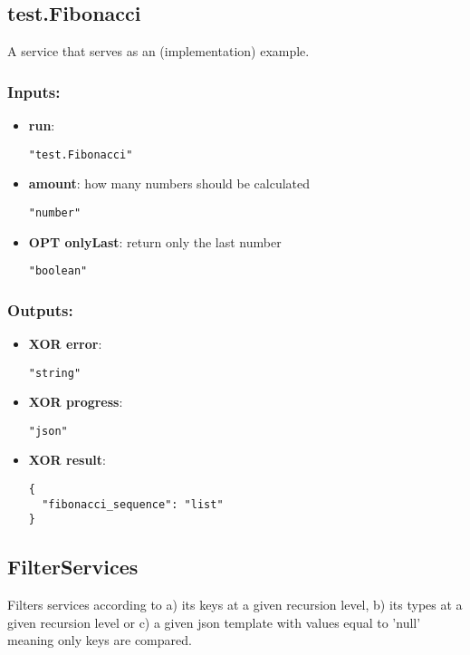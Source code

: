 \subsection{test.Fibonacci}
A service that serves as an (implementation) example.
\subsubsection*{Inputs:}
\begin{itemize}
    \item \textbf{run}: 
\begin{lstlisting}
"test.Fibonacci"
\end{lstlisting}
    \item \textbf{amount}: how many numbers should be calculated
\begin{lstlisting}
"number"
\end{lstlisting}
    \item \textbf{OPT onlyLast}: return only the last number
\begin{lstlisting}
"boolean"
\end{lstlisting}
  \end{itemize}

\subsubsection*{Outputs:}
\begin{itemize}
    \item \textbf{XOR error}: 
\begin{lstlisting}
"string"
\end{lstlisting}
    \item \textbf{XOR progress}: 
\begin{lstlisting}
"json"
\end{lstlisting}
    \item \textbf{XOR result}: 
\begin{lstlisting}
{
  "fibonacci_sequence": "list"
}
\end{lstlisting}
  \end{itemize}

\subsection{FilterServices}
Filters
 services according to a) its keys at a given recursion level, b) its 
types at a given recursion level or c) a given json template with values
 equal to 'null' meaning only keys are compared.

